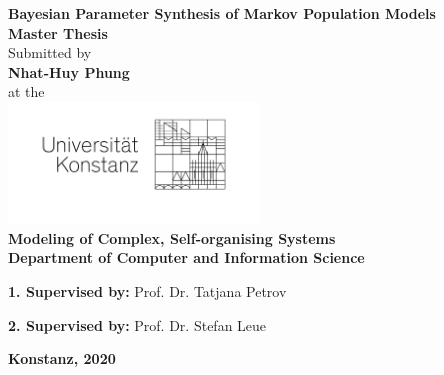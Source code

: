 \begin{titlepage}
  \begin{center}
    {\LARGE \textbf{Bayesian Parameter Synthesis of Markov Population Models}}
    \\[1cm]
    {\Large \textbf{Master Thesis}}
    \\[1cm]
    {\Large Submitted by}
    \\[0.5cm]
    {\LARGE \textbf{Nhat-Huy Phung}}
    \\[0.5cm]
    {\Large at the}
    \\[0.5cm]
    \includegraphics[width=0.5\textwidth]{figures/unisignet-klein.jpg}
    \\[1cm]
    {\large \textbf{Modeling of Complex, Self-organising Systems}}
    \\[1cm]
    {\large \textbf{Department of Computer and Information Science}}
    \\[2cm]
    \begin{minipage}[c]{\textwidth}
      \begin{description}[style=multiline]
        \item {\large \textbf{1. Supervised by:} Prof. Dr. Tatjana Petrov }
        \item {\large \textbf{2. Supervised by:} Prof. Dr. Stefan Leue }
      \end{description}
    \end{minipage}
    \vfill
    {\LARGE \textbf{Konstanz, 2020}}
  \end{center}
\end{titlepage}